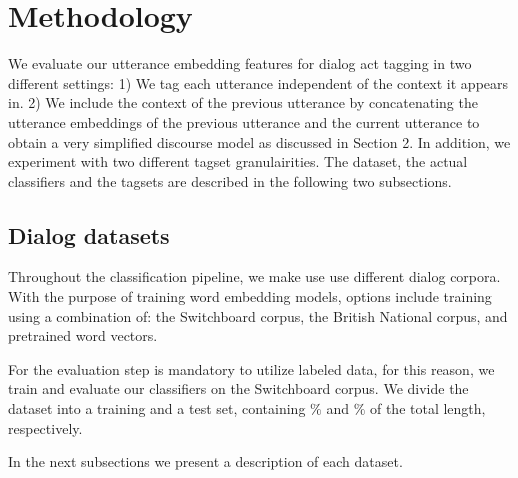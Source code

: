 \section{Methodology}\label{sec:method}
%

We evaluate our utterance embedding features for dialog act tagging in two different settings:
1) We tag each utterance independent of the context it appears in.
2) We include the context of the previous utterance by concatenating the utterance embeddings of the previous utterance and the current utterance to obtain a very simplified discourse model as discussed in Section 2.
In addition, we experiment with two different tagset granulairities.
The dataset, the actual classifiers and the tagsets are described in the following two subsections.

\subsection{Dialog datasets}
Throughout the classification pipeline, we make use use different dialog corpora. With the purpose of training word embedding models, options include training using a combination of: the Switchboard corpus, the British National corpus, and pretrained word vectors.

For the evaluation step is mandatory to utilize labeled data, for this reason, we train and evaluate our classifiers on the Switchboard corpus. We divide the dataset into a training and a test set, containing $\%$ and $\%$ of the total length, respectively. 

In the next subsections we present a description of each dataset.

